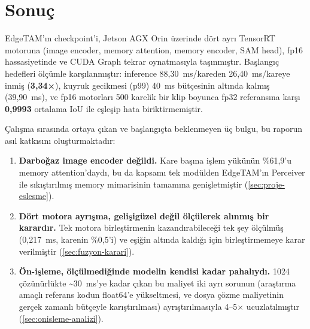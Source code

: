 \chapter{Sonuç}
\label{ch:sonuc}

EdgeTAM'ın checkpoint'i, Jetson AGX Orin üzerinde dört ayrı TensorRT
motoruna (image encoder, memory attention, memory encoder, SAM head),
fp16 hassasiyetinde ve CUDA Graph tekrar oynatmasıyla
taşınmıştır. Başlangıç hedefleri ölçümle karşılanmıştır: inference
88,30~ms/kareden 26,40~ms/kareye inmiş (\textbf{3,34×}), kuyruk
gecikmesi (p99) 40~ms bütçesinin altında kalmış (39,90~ms), ve fp16
motorları 500 karelik bir klip boyunca fp32 referansına karşı
\textbf{0,9993} ortalama IoU ile eşleşip hata biriktirmemiştir.

Çalışma sırasında ortaya çıkan ve başlangıçta beklenmeyen üç bulgu, bu
raporun asıl katkısını oluşturmaktadır:

\begin{enumerate}
  \item \textbf{Darboğaz image encoder değildi.} Kare başına işlem
        yükünün \%61,9'u memory attention'daydı, bu da kapsamı tek
        modülden EdgeTAM'ın Perceiver ile sıkıştırılmış memory
        mimarisinin tamamına genişletmiştir (\cref{sec:proje-eslesme}).
  \item \textbf{Dört motora ayrışma, gelişigüzel değil ölçülerek
        alınmış bir karardır.} Tek motora birleştirmenin
        kazandırabileceği tek şey ölçülmüş (0,217~ms, karenin
        \%0,5'i) ve eşiğin altında kaldığı için birleştirmemeye karar
        verilmiştir (\cref{sec:fuzyon-karari}).
  \item \textbf{Ön-işleme, ölçülmediğinde modelin kendisi kadar
        pahalıydı.} 1024 çözünürlükte \textasciitilde30~ms'ye kadar
        çıkan bu maliyet iki ayrı sorunun (araştırma amaçlı referans
        kodun float64'e yükseltmesi, ve dosya çözme maliyetinin
        gerçek zamanlı bütçeyle karıştırılması) ayrıştırılmasıyla
        4--5× ucuzlatılmıştır (\cref{sec:onisleme-analizi}).
\end{enumerate}
